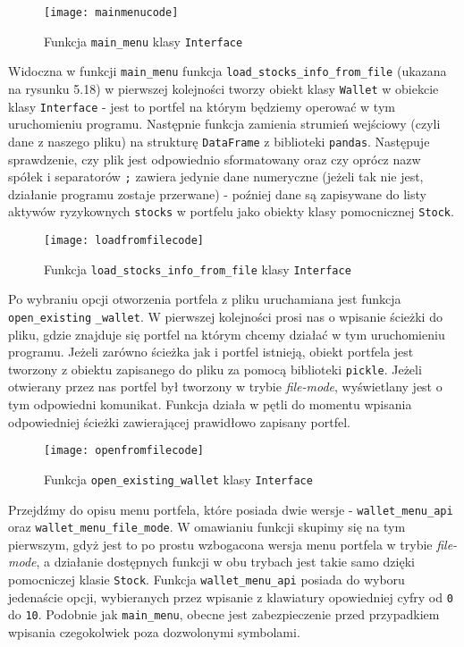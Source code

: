 \documentclass[magister]{dyplom}
\def\code#1{\texttt{#1}}
\begin{document}
\begin{figure}[ht]
	\centering
	\texttt{[image: mainmenucode]}
	\caption{Funkcja \code{main\_menu} klasy \code{Interface}}
\end{figure}
\newpage
Widoczna w funkcji \code{main\_menu} funkcja \code{load\_stocks\_info\_from\_file} (ukazana na rysunku 5.18) w pierwszej kolejności tworzy obiekt klasy \code{Wallet} w obiekcie klasy \code{Interface} - jest to portfel na którym będziemy operować w tym uruchomieniu programu. Następnie funkcja zamienia strumień wejściowy (czyli dane z naszego pliku) na strukturę \code{DataFrame} z biblioteki \code{pandas}. Następuje sprawdzenie, czy plik jest odpowiednio sformatowany oraz czy oprócz nazw spółek i separatorów \code{;} zawiera jedynie dane numeryczne (jeżeli tak nie jest, działanie programu zostaje przerwane) - poźniej dane są zapisywane do listy aktywów ryzykownych \code{stocks} w portfelu jako obiekty klasy pomocnicznej \code{Stock}.

\begin{figure}[ht]
	\centering
	\texttt{[image: loadfromfilecode]}
	\caption{Funkcja \code{load\_stocks\_info\_from\_file} klasy \code{Interface}}
\end{figure}

Po wybraniu opcji otworzenia portfela z pliku uruchamiana jest funkcja \code{open\_existing} \code{\_wallet}. W pierwszej kolejności prosi nas o wpisanie ścieżki do pliku, gdzie znajduje się portfel na którym chcemy działać w tym uruchomieniu programu. Jeżeli zarówno ścieżka jak i portfel istnieją, obiekt portfela jest tworzony z obiektu zapisanego do pliku za pomocą biblioteki \code{pickle}. Jeżeli otwierany przez nas portfel był tworzony w trybie \textit{file-mode}, wyświetlany jest o tym odpowiedni komunikat. Funkcja działa w pętli do momentu wpisania odpowiedniej ścieżki zawierającej prawidłowo zapisany portfel.

\begin{figure}[ht]
	\centering
	\texttt{[image: openfromfilecode]}
	\caption{Funkcja \code{open\_existing\_wallet} klasy \code{Interface}}
\end{figure}
\newpage
Przejdźmy do opisu menu portfela, które posiada dwie wersje - \code{wallet\_menu\_api} oraz \newline
\code{wallet\_menu\_file\_mode}. W omawianiu funkcji skupimy się na tym pierwszym, gdyż jest to po prostu wzbogacona wersja menu portfela w trybie \textit{file-mode}, a działanie dostępnych funkcji w obu trybach jest takie samo dzięki pomocniczej klasie \code{Stock}.
Funkcja \code{wallet\_menu\_api} posiada do wyboru jedenaście opcji, wybieranych przez wpisanie z klawiatury opowiedniej cyfry od \code{0} do \code{10}. Podobnie jak \code{main\_menu}, obecne jest zabezpieczenie przed przypadkiem wpisania czegokolwiek poza dozwolonymi symbolami. 
\end{document}
